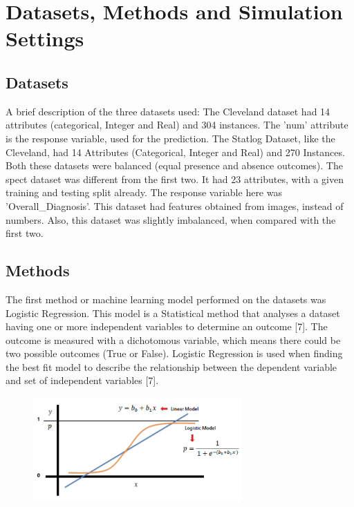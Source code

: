 \documentclass[conference]{IEEEtran}
\begin{document}
\section{Datasets, Methods and Simulation Settings}
\subsection{Datasets}
A brief description of the three datasets used: The Cleveland dataset had 14 attributes (categorical, Integer and Real) and 304 instances. The 'num' attribute is the response variable, used for the prediction. The Statlog Dataset, like the Cleveland, had 14 Attributes (Categorical, Integer and Real) and 270 Instances. Both these datasets were balanced (equal presence and absence outcomes). The spect dataset was different from the first two. It had 23 attributes, with a given training and testing split already. The response variable here was 'Overall\_Diagnosis'. This dataset had features obtained from images, instead of numbers. Also, this dataset was slightly imbalanced, when compared with the first two. 
\subsection{Methods}
The first method or machine learning model performed on the datasets was Logistic Regression. This model is a Statistical method that analyses a dataset having one or more independent variables to determine an outcome [7]. The outcome is measured with a dichotomous variable, which means there could be two possible outcomes (True or False). Logistic Regression is used when finding the best fit model to describe the relationship between the dependent variable and set of independent variables [7].\\

\begin{figure}
	\centering
	\includegraphics[height=4cm, width=8cm]{images/lr}
	\linebreak
	\label{fig:logistic-regression-graph}
\end{figure}
\end{document}
